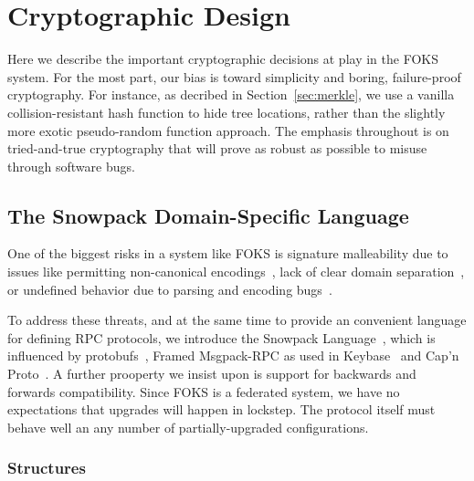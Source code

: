 
\section{Cryptographic Design}
\label{sec:crypto}

Here we describe the important cryptographic decisions at play in the FOKS
system.  For the most part, our bias is toward simplicity and boring,
failure-proof cryptography.  For instance, as decribed in
Section~\ref{sec:merkle}, we use a vanilla collision-resistant hash function to
hide tree locations, rather than the slightly more exotic pseudo-random function
approach. The emphasis throughout is on tried-and-true cryptography that will
prove as robust as possible to misuse through software bugs.

\subsection{The Snowpack Domain-Specific Language}

One of the biggest risks in a system like FOKS is signature malleability
due to issues like permitting non-canonical encodings~\cite{conf/crypto/Bleichenbacher98,bip66}, 
lack of clear domain separation~\cite{ncc2019,cryptoeprint:2020/241}, 
or undefined behavior due to parsing and encoding bugs~\cite{heartbleed2014durumeric}.

To address these threats, and at the same time to provide an convenient language for 
defining RPC protocols, we introduce the Snowpack Language~\cite{snowpack}, which is influenced
by protobufs~\cite{protobuf}, Framed Msgpack-RPC as used in Keybase~\cite{keybase}
and Cap'n Proto~\cite{capnproto}. A further prooperty we insist upon is support
for backwards and forwards compatibility. Since FOKS is a federated system, we have 
no expectations that upgrades will happen in lockstep. The protocol itself must behave
well an any number of partially-upgraded configurations.

\subsubsection{Structures}
\label{sec:snowpack-structures}

